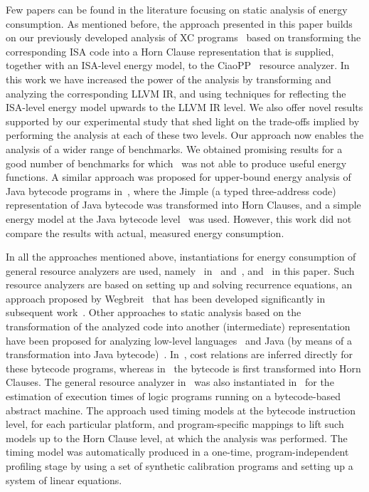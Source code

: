 \documentclass{llncs}
\newcommand{\level}{level\xspace}
\newcommand{\levels}{levels\xspace}
\newcommand{\llvmir}{LLVM IR\xspace}
\newcommand{\ciaopp}{CiaoPP\xspace}
\begin{document}
Few papers can be found in the literature focusing on static analysis
of energy consumption. 
As mentioned before, the approach presented in this paper builds on
our previously developed analysis of XC
programs~\cite{isa-energy-lopstr13-final} based on transforming the
corresponding ISA code into a Horn Clause representation that is
supplied, together with an ISA-\level energy model, to the
\ciaopp~\cite{ciaopp-sas03-journal-scp} resource analyzer.  In this
work we have increased the power of the analysis by transforming and
analyzing the corresponding \llvmir, and using techniques for
reflecting the ISA-\level energy model upwards to the \llvmir \level.
We also offer novel results supported by our experimental study that
shed light on the trade-offs implied by performing the analysis at
each of these two \levels. Our approach now enables the analysis of a
wider range of benchmarks.  We obtained promising results for a good
number of benchmarks for which~\cite{isa-energy-lopstr13-final} was
not able to produce useful energy functions.
A similar approach was proposed for upper-bound energy analysis of
Java bytecode programs in~\cite{NMHLFM08}, where the Jimple (a typed
three-address code) representation of Java bytecode was transformed
into Horn Clauses, and a simple energy model at the Java bytecode
\level~\cite{LL07} was used.  However, this work did not compare the
results with actual, measured energy consumption.

In all the approaches mentioned above, instantiations for energy
consumption of general resource analyzers are used,
namely~\cite{resource-iclp07} in~\cite{NMHLFM08}
and~\cite{isa-energy-lopstr13-final},
and~\cite{plai-resources-iclp14} in this paper. Such resource
analyzers are based on setting up and solving recurrence equations, an
approach proposed by Wegbreit~\cite{DBLP:journals/cacm/Wegbreit75}
that has been developed significantly in subsequent
work~\cite{Rosendahl89,granularity,low-bounds-ilps97,vh-03,resource-iclp07,AlbertAGP11a,plai-resources-iclp14}.
Other approaches to static analysis
based on the transformation of the analyzed code into another
(intermediate) representation have been proposed for analyzing
low-level languages~\cite{HenriksenG06} and Java (by means of a
transformation into Java
bytecode)~\cite{jvm-cost-esop}. In~\cite{jvm-cost-esop}, cost
relations are inferred directly for these bytecode programs, whereas
in~\cite{NMHLFM08} the bytecode is first transformed into Horn
Clauses.
The general resource analyzer in~\cite{resource-iclp07} was also
instantiated in~\cite{estim-exec-time-ppdp08} for the estimation of
execution times of logic programs running on a bytecode-based abstract
machine. The approach used timing models at the bytecode instruction
level, for each particular platform,
and program-specific mappings to lift such models up to the Horn
Clause level, at which the analysis was performed. 
The timing model was automatically produced in a one-time,
program-independent profiling stage by using a set of synthetic
calibration programs and setting up a system of linear equations.
\end{document}
